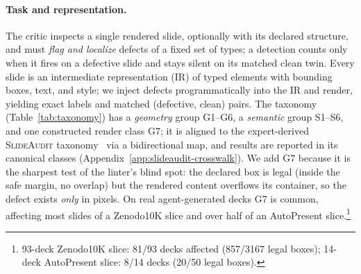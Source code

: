 \documentclass[10pt]{article}
\newcommand{\g}[1]{\textsf{#1}}        %
\begin{document}
\paragraph{Task and representation.}
The critic inspects a single rendered slide, optionally with its declared structure, and must \emph{flag and
localize} defects of a fixed set of types; a detection counts only when it fires on a defective slide and stays
silent on its matched clean twin. Every slide is an intermediate representation (IR) of typed elements with
bounding boxes, text, and style; we inject defects programmatically into the IR and render, yielding exact
labels and matched (defective, clean) pairs. The taxonomy (Table~\ref{tab:taxonomy}) has a \emph{geometry}
group \g{G1}--\g{G6}, a \emph{semantic} group \g{S1}--\g{S6}, and one constructed render class \g{G7}; it is
aligned to the expert-derived \textsc{SlideAudit} taxonomy~\cite{slideaudit} via a bidirectional map, and
results are reported in its canonical classes (Appendix~\ref{app:slideaudit-crosswalk}). We add \g{G7} because
it is the sharpest test of the linter's blind spot: the declared box is legal (inside the safe margin, no
overlap) but the rendered content overflows its container, so the defect exists \emph{only} in pixels. On real
agent-generated decks \g{G7} is common, affecting most slides of a Zenodo10K slice and over half of an
AutoPresent slice.\footnote{93-deck Zenodo10K slice: 81/93 decks affected (857/3167 legal boxes); 14-deck
AutoPresent slice: 8/14 decks (20/50 legal boxes).}
\end{document}
